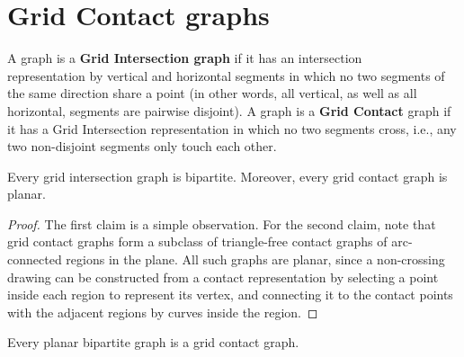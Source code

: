 \section{Grid Contact graphs}

\begin{defn}
	A graph is a \textbf{Grid Intersection graph} if it has an intersection \\ representation by vertical and horizontal segments in which no two segments of the same direction share a point (in other words, all vertical, as well as all horizontal, segments are pairwise disjoint). A graph is a \textbf{Grid Contact} graph if it has a Grid Intersection representation in which no two segments cross, i.e., any two non-disjoint segments only touch each other.
\end{defn}

\begin{prop}
	Every grid intersection graph is bipartite. Moreover, every grid contact graph is planar.
\end{prop}

\begin{proof}
	The first claim is a simple observation. For the second claim, note that grid contact graphs form a subclass of triangle-free contact graphs of arc-connected regions in the plane. All such graphs are planar, since a non-crossing drawing can be constructed from a contact representation by selecting a point inside each region to represent its vertex, and connecting it to the contact points with the adjacent regions by curves inside the region.
\end{proof}

\begin{thm}
	Every planar bipartite graph is a grid contact graph.
	\label{thm-3}
\end{thm}

